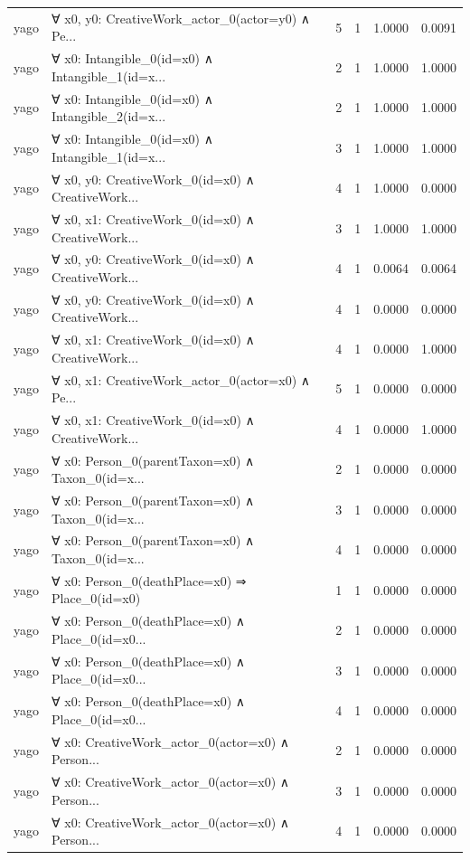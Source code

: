 \documentclass[11pt,a4paper]{article}
\begin{document}
\begin{table}[h!]
\begin{longtable}{|l|p{6cm}|c|c|c|c|}
yago & ∀ x0, y0: CreativeWork\_actor\_0(actor=y0) ∧ Pe... & 5 & 1 & 1.0000 & 0.0091 \\
yago & ∀ x0: Intangible\_0(id=x0) ∧ Intangible\_1(id=x... & 2 & 1 & 1.0000 & 1.0000 \\
yago & ∀ x0: Intangible\_0(id=x0) ∧ Intangible\_2(id=x... & 2 & 1 & 1.0000 & 1.0000 \\
yago & ∀ x0: Intangible\_0(id=x0) ∧ Intangible\_1(id=x... & 3 & 1 & 1.0000 & 1.0000 \\
yago & ∀ x0, y0: CreativeWork\_0(id=x0) ∧ CreativeWork... & 4 & 1 & 1.0000 & 0.0000 \\
yago & ∀ x0, x1: CreativeWork\_0(id=x0) ∧ CreativeWork... & 3 & 1 & 1.0000 & 1.0000 \\
yago & ∀ x0, y0: CreativeWork\_0(id=x0) ∧ CreativeWork... & 4 & 1 & 0.0064 & 0.0064 \\
yago & ∀ x0, y0: CreativeWork\_0(id=x0) ∧ CreativeWork... & 4 & 1 & 0.0000 & 0.0000 \\
yago & ∀ x0, x1: CreativeWork\_0(id=x0) ∧ CreativeWork... & 4 & 1 & 0.0000 & 1.0000 \\
yago & ∀ x0, x1: CreativeWork\_actor\_0(actor=x0) ∧ Pe... & 5 & 1 & 0.0000 & 0.0000 \\
yago & ∀ x0, x1: CreativeWork\_0(id=x0) ∧ CreativeWork... & 4 & 1 & 0.0000 & 1.0000 \\
yago & ∀ x0: Person\_0(parentTaxon=x0) ∧ Taxon\_0(id=x... & 2 & 1 & 0.0000 & 0.0000 \\
yago & ∀ x0: Person\_0(parentTaxon=x0) ∧ Taxon\_0(id=x... & 3 & 1 & 0.0000 & 0.0000 \\
yago & ∀ x0: Person\_0(parentTaxon=x0) ∧ Taxon\_0(id=x... & 4 & 1 & 0.0000 & 0.0000 \\
yago & ∀ x0: Person\_0(deathPlace=x0) ⇒ Place\_0(id=x0) & 1 & 1 & 0.0000 & 0.0000 \\
yago & ∀ x0: Person\_0(deathPlace=x0) ∧ Place\_0(id=x0... & 2 & 1 & 0.0000 & 0.0000 \\
yago & ∀ x0: Person\_0(deathPlace=x0) ∧ Place\_0(id=x0... & 3 & 1 & 0.0000 & 0.0000 \\
yago & ∀ x0: Person\_0(deathPlace=x0) ∧ Place\_0(id=x0... & 4 & 1 & 0.0000 & 0.0000 \\
yago & ∀ x0: CreativeWork\_actor\_0(actor=x0) ∧ Person... & 2 & 1 & 0.0000 & 0.0000 \\
yago & ∀ x0: CreativeWork\_actor\_0(actor=x0) ∧ Person... & 3 & 1 & 0.0000 & 0.0000 \\
yago & ∀ x0: CreativeWork\_actor\_0(actor=x0) ∧ Person... & 4 & 1 & 0.0000 & 0.0000 \\

\end{longtable}
\end{table}
\end{document}
